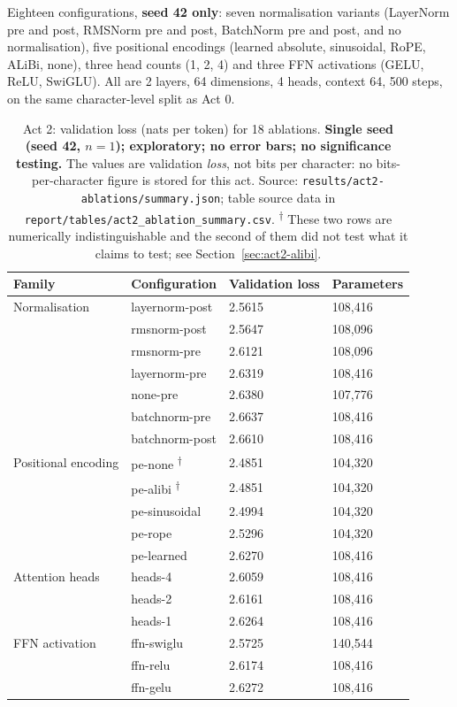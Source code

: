 \documentclass[11pt,a4paper]{article}
\begin{document}
Eighteen configurations, \textbf{seed 42 only}: seven normalisation variants
(LayerNorm pre and post, RMSNorm pre and post, BatchNorm pre and post, and no
normalisation), five positional encodings (learned absolute, sinusoidal, RoPE,
ALiBi, none), three head counts (1, 2, 4) and three FFN activations (GELU,
ReLU, SwiGLU). All are 2 layers, 64 dimensions, 4 heads, context 64, 500 steps,
on the same character-level split as Act 0.

\begin{table}[H]
\centering
\begin{tabular}{L{3.4cm}L{4.6cm}R{2.8cm}R{2.6cm}}
\toprule
Family & Configuration & Validation loss & Parameters \\
\midrule
Normalisation & layernorm-post & 2.5615 & 108,416 \\
 & rmsnorm-post & 2.5647 & 108,096 \\
 & rmsnorm-pre & 2.6121 & 108,096 \\
 & layernorm-pre & 2.6319 & 108,416 \\
 & none-pre & 2.6380 & 107,776 \\
 & batchnorm-pre & 2.6637 & 108,416 \\
 & batchnorm-post & 2.6610 & 108,416 \\
\midrule
Positional encoding & pe-none \textsuperscript{$\dagger$} & 2.4851 & 104,320 \\
 & pe-alibi \textsuperscript{$\dagger$} & 2.4851 & 104,320 \\
 & pe-sinusoidal & 2.4994 & 104,320 \\
 & pe-rope & 2.5296 & 104,320 \\
 & pe-learned & 2.6270 & 108,416 \\
\midrule
Attention heads & heads-4 & 2.6059 & 108,416 \\
 & heads-2 & 2.6161 & 108,416 \\
 & heads-1 & 2.6264 & 108,416 \\
\midrule
FFN activation & ffn-swiglu & 2.5725 & 140,544 \\
 & ffn-relu & 2.6174 & 108,416 \\
 & ffn-gelu & 2.6272 & 108,416 \\
\bottomrule
\end{tabular}
\caption{Act 2: validation loss (nats per token) for 18 ablations.
\textbf{Single seed (seed 42, $n = 1$); exploratory; no error bars; no
significance testing.} The values are validation \emph{loss}, not bits per
character: no bits-per-character figure is stored for this act. Source:
\texttt{results/act2-ablations/summary.json}; table source data in
\texttt{report/tables/act2\_ablation\_summary.csv}.
\textsuperscript{$\dagger$} These two rows are numerically indistinguishable
and the second of them did not test what it claims to test; see
Section~\ref{sec:act2-alibi}.}
\label{tab:act2}
\end{table}
\end{document}
